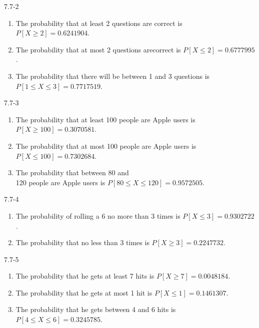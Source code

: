 \begin{exsol@solution}{7.7-2}

\begin{enumerate}
\item The probability that at least 2 questions are correct is $P[X \ge 2] = 0.6241904$.
\item The probability that at most 2 questions arecorrect is $P[X \le 2] = 0.6777995$.
\item The probability that there  will be between 1 and 3 questions is $P[1 \le X \le 3] = 0.7717519$.
\end{enumerate}
\end{exsol@solution}
\begin{exsol@solution}{7.7-3}

\begin{enumerate}
\item The probability that at least 100 people are Apple users is $P[X \ge 100] = 0.3070581$.
\item The probability that at most 100 people are Apple users is $P[X \le 100] = 0.7302684$.
\item The probability that between 80 and \\ 120 people are Apple users is $P[ 80 \le X \le 120] = 0.9572505$.
\end{enumerate}
\end{exsol@solution}
\begin{exsol@solution}{7.7-4}


\begin{enumerate}
\item The probability of rolling a 6 no more than 3 times is $P[X \le 3] = 0.9302722$.
\item The probability that no less than 3 times is $P[X \ge 3] = 0.2247732$.
\end{enumerate}
\end{exsol@solution}
\begin{exsol@solution}{7.7-5}

\begin{enumerate}
\item The probability that he gets at least 7 hits is $P[X \ge 7] = 0.0048184$.
\item The probability that he gets at most 1 hit is $P[X \le 1] = 0.1461307$.
\item The probability that he gets between 4 and 6 hits is $P[4 \le X \le 6] = 0.3245785$.
\end{enumerate}

\end{exsol@solution}
